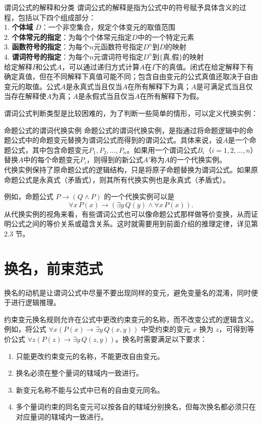\documentclass[lang=cn,11pt]{elegantbook}
\begin{document}
\begin{definition}{谓词公式的解释和分类}
谓词公式的解释是指为公式中的符号赋予具体含义的过程，包括以下四个组成部分：\\
1. \textbf{个体域} $D$：一个非空集合，规定个体变元的取值范围\\
2. \textbf{个体常元的指定}：为每个个体常元指定$D$中的一个特定元素\\
3. \textbf{函数符号的指定}：为每个$n$元函数符号指定$D^n$到$D$的映射\\
4. \textbf{谓词符号的指定}：为每个$n$元谓词符号指定$D^n$到$\{\text{真,假}\}$的映射\\
给定解释$I$和公式$A$，可以通过递归方式计算$A$在$I$下的真值。闭式在给定解释下有确定真值，但在不同解释下真值可能不同；包含自由变元的公式真值还取决于自由变元的取值。公式$A$是永真式当且仅当$A$在所有解释下为真；$A$是可满足式当且仅当存在解释使$A$为真；$A$是永假式当且仅当$A$在所有解释下为假。
\end{definition}
谓词公式判断类型是比较困难的，为了判断一些简单的情形，可以定义代换实例：
\begin{definition}{命题公式的谓词代换实例}
命题公式的谓词代换实例，是指通过将命题逻辑中的命题公式中的命题变元替换为谓词公式而得到的谓词公式。具体来说，设$A$是一个命题公式，其中包含命题变元$P_1, P_2, \ldots, P_n$。如果用一个谓词公式$B_i$（$i = 1, 2, \ldots, n$）替换$A$中的每个命题变元$P_i$，则得到的新公式$A'$称为$A$的一个代换实例。\\
代换实例保持了原命题公式的逻辑结构，只是将原子命题替换为谓词公式。如果原命题公式是永真式（矛盾式），则其所有代换实例也是永真式（矛盾式）。
\end{definition}
例如，命题公式 $P \rightarrow (Q \land P)$ 的一个代换实例可以是
\[
\forall x\, P(x) \rightarrow (\exists y\, Q(y) \land \forall x\, P(x)).
\]
从代换实例的视角来看，有些谓词公式也可以像命题公式那样做等价变换，从而证明公式之间的等价关系或蕴含关系。这时就需要用到前面介绍的推理定律，详见第 2.3 节。
\section{换名，前束范式}
换名的动机是让谓词公式中尽量不要出现同样的变元，避免变量名的混淆，同时便于进行逻辑推理。

约束变元换名规则允许在公式中更改约束变元的名称，而不改变公式的逻辑含义。例如，将公式 $\forall x (P(x) \rightarrow \exists y\, Q(x,y))$ 中受约束的变元 $x$ 换为 $z$，可得到等价公式 $\forall z (P(z) \rightarrow \exists y\, Q(z,y))$。换名时需要满足以下要求：
\begin{enumerate}
    \item 只能更改约束变元的名称，不能更改自由变元。
    \item 换名必须在整个量词的辖域内一致进行。
    \item 新变元名称不能与公式中已有的自由变元同名。
    \item 多个量词约束的同名变元可以按各自的辖域分别换名，但每次换名都必须只在对应量词的辖域内一致进行。
\end{enumerate}
\end{document}
